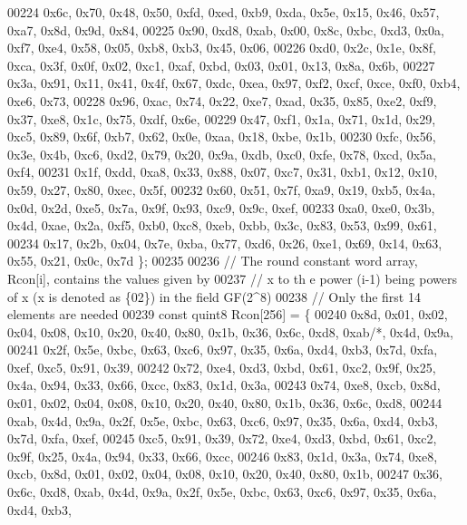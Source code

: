 \begin{DoxyCode}
00224       0x6c, 0x70, 0x48, 0x50, 0xfd, 0xed, 0xb9, 0xda, 0x5e, 0x15, 0x46, 0x57, 0xa7, 0x8d, 0x9d, 0x84,
00225       0x90, 0xd8, 0xab, 0x00, 0x8c, 0xbc, 0xd3, 0x0a, 0xf7, 0xe4, 0x58, 0x05, 0xb8, 0xb3, 0x45, 0x06,
00226       0xd0, 0x2c, 0x1e, 0x8f, 0xca, 0x3f, 0x0f, 0x02, 0xc1, 0xaf, 0xbd, 0x03, 0x01, 0x13, 0x8a, 0x6b,
00227       0x3a, 0x91, 0x11, 0x41, 0x4f, 0x67, 0xdc, 0xea, 0x97, 0xf2, 0xcf, 0xce, 0xf0, 0xb4, 0xe6, 0x73,
00228       0x96, 0xac, 0x74, 0x22, 0xe7, 0xad, 0x35, 0x85, 0xe2, 0xf9, 0x37, 0xe8, 0x1c, 0x75, 0xdf, 0x6e,
00229       0x47, 0xf1, 0x1a, 0x71, 0x1d, 0x29, 0xc5, 0x89, 0x6f, 0xb7, 0x62, 0x0e, 0xaa, 0x18, 0xbe, 0x1b,
00230       0xfc, 0x56, 0x3e, 0x4b, 0xc6, 0xd2, 0x79, 0x20, 0x9a, 0xdb, 0xc0, 0xfe, 0x78, 0xcd, 0x5a, 0xf4,
00231       0x1f, 0xdd, 0xa8, 0x33, 0x88, 0x07, 0xc7, 0x31, 0xb1, 0x12, 0x10, 0x59, 0x27, 0x80, 0xec, 0x5f,
00232       0x60, 0x51, 0x7f, 0xa9, 0x19, 0xb5, 0x4a, 0x0d, 0x2d, 0xe5, 0x7a, 0x9f, 0x93, 0xc9, 0x9c, 0xef,
00233       0xa0, 0xe0, 0x3b, 0x4d, 0xae, 0x2a, 0xf5, 0xb0, 0xc8, 0xeb, 0xbb, 0x3c, 0x83, 0x53, 0x99, 0x61,
00234       0x17, 0x2b, 0x04, 0x7e, 0xba, 0x77, 0xd6, 0x26, 0xe1, 0x69, 0x14, 0x63, 0x55, 0x21, 0x0c, 0x7d \};
00235 
00236     \textcolor{comment}{// The round constant word array, Rcon[i], contains the values given by}
00237     \textcolor{comment}{// x to th e power (i-1) being powers of x (x is denoted as \{02\}) in the field GF(2^8)}
00238     \textcolor{comment}{// Only the first 14 elements are needed}
00239     \textcolor{keyword}{const} quint8 Rcon[256] = \{
00240         0x8d, 0x01, 0x02, 0x04, 0x08, 0x10, 0x20, 0x40, 0x80, 0x1b, 0x36, 0x6c, 0xd8, 0xab\textcolor{comment}{/*, 0x4d, 0x9a,}
00241 \textcolor{comment}{        0x2f, 0x5e, 0xbc, 0x63, 0xc6, 0x97, 0x35, 0x6a, 0xd4, 0xb3, 0x7d, 0xfa, 0xef, 0xc5, 0x91, 0x39,}
00242 \textcolor{comment}{        0x72, 0xe4, 0xd3, 0xbd, 0x61, 0xc2, 0x9f, 0x25, 0x4a, 0x94, 0x33, 0x66, 0xcc, 0x83, 0x1d, 0x3a,}
00243 \textcolor{comment}{        0x74, 0xe8, 0xcb, 0x8d, 0x01, 0x02, 0x04, 0x08, 0x10, 0x20, 0x40, 0x80, 0x1b, 0x36, 0x6c, 0xd8,}
00244 \textcolor{comment}{        0xab, 0x4d, 0x9a, 0x2f, 0x5e, 0xbc, 0x63, 0xc6, 0x97, 0x35, 0x6a, 0xd4, 0xb3, 0x7d, 0xfa, 0xef,}
00245 \textcolor{comment}{        0xc5, 0x91, 0x39, 0x72, 0xe4, 0xd3, 0xbd, 0x61, 0xc2, 0x9f, 0x25, 0x4a, 0x94, 0x33, 0x66, 0xcc,}
00246 \textcolor{comment}{        0x83, 0x1d, 0x3a, 0x74, 0xe8, 0xcb, 0x8d, 0x01, 0x02, 0x04, 0x08, 0x10, 0x20, 0x40, 0x80, 0x1b,}
00247 \textcolor{comment}{        0x36, 0x6c, 0xd8, 0xab, 0x4d, 0x9a, 0x2f, 0x5e, 0xbc, 0x63, 0xc6, 0x97, 0x35, 0x6a, 0xd4, 0xb3,}

\end{DoxyCode}

